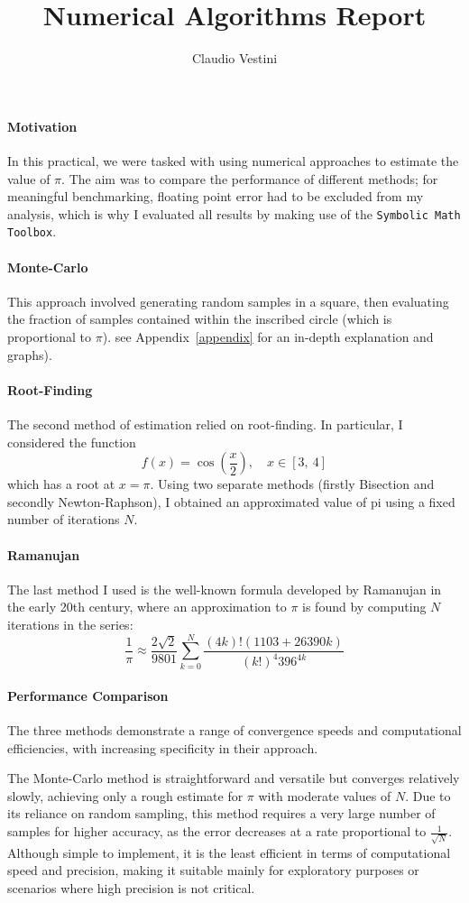 \documentclass[hidelinks]{article}
\title{\vspace{-4cm} Numerical Algorithms Report}
\author{\vspace{-2cm} Claudio Vestini}
\date{}
\begin{document}
\maketitle
%
\paragraph{Motivation}
In this practical, we were tasked with using numerical approaches to estimate the value of $\pi$. The aim was to compare the performance of different methods; for meaningful benchmarking, floating point error had to be excluded from my analysis, which is why I evaluated all results by making use of the \texttt{Symbolic Math Toolbox}.
%
\paragraph{Monte-Carlo}
This approach involved generating random samples in a square, then evaluating the fraction of samples contained within the inscribed circle (which is proportional to $\pi$).  see Appendix~\ref{appendix} for an in-depth explanation and graphs).
\paragraph{Root-Finding}
The second method of estimation relied on root-finding. In particular, I considered the function
\[
f(x) = \cos{(\frac{x}{2})}, \quad x \in [3,~4]
\]
which has a root at $x = \pi$. Using two separate methods (firstly Bisection and secondly Newton-Raphson), I obtained an approximated value of pi using a fixed number of iterations $N$.
%
\paragraph{Ramanujan}
The last method I used is the well-known formula developed by Ramanujan in the early 20th century, where an approximation to $\pi$ is found by computing $N$ iterations in the series:
\[
\frac{1}{\pi} \approx \frac{2 \sqrt{2}}{9801} \sum_{k=0}^{N} \frac{(4k)! (1103 + 26390k)}{(k!)^4 396^{4k}}
\]
\paragraph{Performance Comparison}
The three methods demonstrate a range of convergence speeds and computational efficiencies, with increasing specificity in their approach.

The Monte-Carlo method is straightforward and versatile but converges relatively slowly, achieving only a rough estimate for \(\pi\) with moderate values of \(N\). Due to its reliance on random sampling, this method requires a very large number of samples for higher accuracy, as the error decreases at a rate proportional to \( \frac{1}{\sqrt{N}} \). Although simple to implement, it is the least efficient in terms of computational speed and precision, making it suitable mainly for exploratory purposes or scenarios where high precision is not critical.
\end{document}
